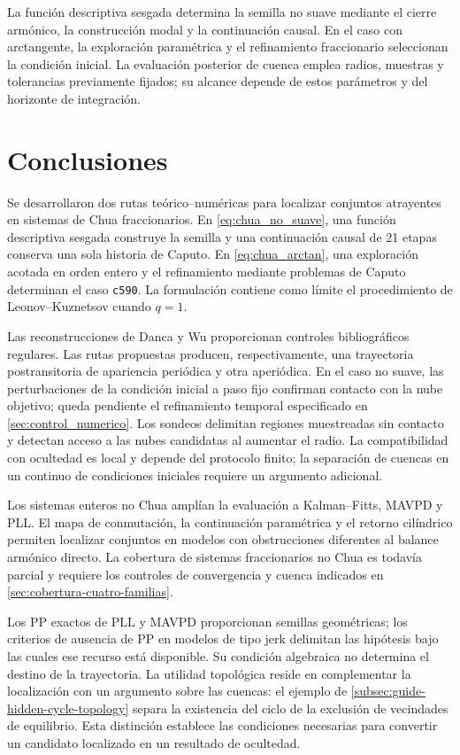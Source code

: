 La función descriptiva sesgada determina la semilla no suave mediante el
cierre armónico, la construcción modal y la continuación causal. En el caso
con arctangente, la exploración paramétrica y el refinamiento fraccionario
seleccionan la condición inicial. La evaluación posterior de cuenca emplea
radios, muestras y tolerancias previamente fijados; su alcance depende de
estos parámetros y del horizonte de integración.

\section{Conclusiones}
\label{sec:conclusiones}
\enlargethispage{2\baselineskip}

Se desarrollaron dos rutas teórico--numéricas para localizar conjuntos
atrayentes en sistemas de Chua fraccionarios. En
\cref{eq:chua_no_suave}, una función descriptiva sesgada construye la semilla
y una continuación causal de 21 etapas conserva una sola historia de Caputo.
En \cref{eq:chua_arctan}, una exploración acotada en orden entero y el
refinamiento mediante problemas de Caputo determinan el caso
\texttt{c590}. La formulación contiene como límite el procedimiento de
Leonov--Kuznetsov cuando \(q=1\).

Las reconstrucciones de Danca y Wu proporcionan controles bibliográficos
regulares. Las rutas propuestas producen, respectivamente, una trayectoria
postransitoria de apariencia periódica y otra aperiódica. En el caso no
suave, las perturbaciones de la condición inicial a paso fijo confirman
contacto con la nube objetivo; queda pendiente el refinamiento temporal
especificado en \cref{sec:control_numerico}.
\ifHAFOBasinMaterial
Los sondeos delimitan regiones muestreadas sin contacto y detectan acceso a
las nubes candidatas al aumentar el radio. La compatibilidad con ocultedad
es local y depende del protocolo finito; la separación de cuencas en un
continuo de condiciones iniciales requiere un argumento adicional.
\fi

Los sistemas enteros no Chua amplían la evaluación a Kalman--Fitts, MAVPD y
PLL. El mapa de conmutación, la continuación paramétrica y el retorno
cilíndrico permiten localizar conjuntos en modelos con obstrucciones
diferentes al balance armónico directo. La cobertura de sistemas
fraccionarios no Chua es todavía parcial y requiere los controles de
convergencia y cuenca indicados en \cref{sec:cobertura-cuatro-familias}.

Los PP exactos de PLL y MAVPD proporcionan semillas geométricas; los criterios
de ausencia de PP en modelos de tipo jerk delimitan las hipótesis bajo las
cuales ese recurso está disponible. Su condición algebraica no determina el
destino de la trayectoria. La utilidad topológica reside en complementar la
localización con un argumento sobre las cuencas: el ejemplo de
\cref{subsec:guide-hidden-cycle-topology} separa la existencia del ciclo de la
exclusión de vecindades de equilibrio. Esta distinción establece las
condiciones necesarias para convertir un candidato localizado en un
resultado de ocultedad.
